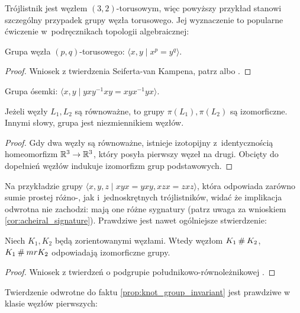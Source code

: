 Trójlistnik jest węzłem $(3, 2)$-torusowym, więc powyższy przykład stanowi szczególny przypadek grupy węzła torusowego.
Jej wyznaczenie to popularne ćwiczenie w~podręcznikach topologii algebraicznej:

\begin{example}
    Grupa węzła $(p,q)$-torusowego: $\langle x, y \mid x^p = y^q \rangle$.
\end{example}

\begin{proof}
    Wniosek z twierdzenia Seiferta-van Kampena, patrz \cite[s. 77]{kawauchi96} albo \cite[s. 47]{hatcher02}.
\end{proof}

\begin{example}
    Grupa ósemki: $\langle x, y \mid yxy^{{-1}}xy=xyx^{{-1}}yx \rangle$.
\end{example}

\begin{proposition}
    \label{prop:knot_group_invariant}
    Jeżeli węzły $L_1, L_2$ są równoważne, to grupy $\pi(L_1), \pi(L_2)$ są izomorficzne.
    Innymi słowy, grupa jest niezmiennikiem węzłów.
\end{proposition}

\begin{proof}
    Gdy dwa węzły są równoważne, istnieje izotopijny z~identycznością homeomorfizm $\mathbb R^3 \to \mathbb R^3$, który posyła pierwszy węzeł na drugi.
    Obcięty do dopełnień węzłów indukuje izomorfizm grup podstawowych.
\end{proof}

Na przykładzie grupy $\langle x,y,z \mid xyx=yxy,xzx=zxz\rangle$, która odpowiada zarówno sumie prostej różno-, jak i~jednoskrętnych trójlistników, widać że implikacja odwrotna nie zachodzi: mają one różne sygnatury (patrz uwaga za wnioskiem \ref{cor:acheiral_signature}).
Prawdziwe jest nawet ogólniejsze stwierdzenie:

\begin{proposition}
    Niech $K_1, K_2$ będą zorientowanymi węzłami.
    Wtedy węzłom $K_1 \mathbin{\#} K_2$, $K_1 \mathbin{\#} mr K_2$ odpowiadają izomorficzne grupy.
\end{proposition}

\begin{proof}
    Wniosek z twierdzeń o podgrupie południkowo-równoleżnikowej \cite[s. 75]{kawauchi96}.
\end{proof}

Twierdzenie odwrotne do faktu \ref{prop:knot_group_invariant} jest prawdziwe w klasie węzłów pierwszych:

